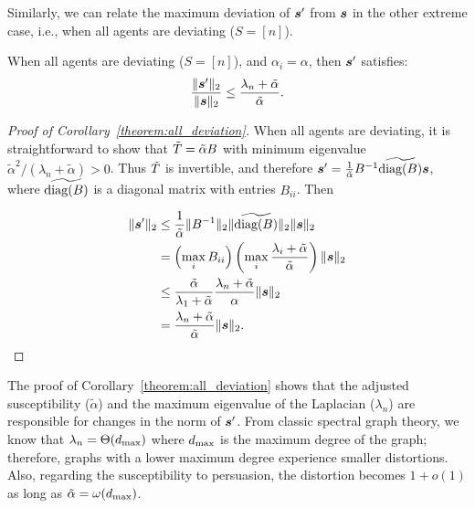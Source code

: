 Similarly, we can relate the maximum deviation of $\bm{s}^\prime$ from $\bm{s}$ in the other extreme case, i.e., when all agents are deviating ($S = [n]$). %
\begin{corollary}
    \label{theorem:all_deviation}
    When all agents are deviating ($S = [n]$), and $\alpha_i = \alpha$, then $\bm{s}^\prime$ satisfies: $$\frac {\| \bm{s}^\prime \|_2} {\| \bm{s} \|_2}  \le \frac {\lambda_n + \tilde \alpha} {\tilde \alpha}.$$
\end{corollary}

\begin{proof}[Proof of Corollary~\ref{theorem:all_deviation}]
    When all agents are deviating, it is straightforward to show that $\Tilde T = \tilde \alpha B$ with minimum eigenvalue $\tilde \alpha^2 / (\lambda_n + \tilde \alpha) > 0$. Thus $\Tilde T$ is invertible, and therefore $\bm{s}^\prime = \frac {1} {\tilde \alpha} B^{-1} \widetilde {\textrm{diag} (B)} \bm{s}$, where $\widetilde {\textrm{diag} (B)}$ is a diagonal matrix with entries $B_{ii}$. Then 

    \begin{align*}
        \| \bm{s}^\prime \|_2 & \le \frac {1} {\tilde \alpha} \| B^{-1} \|_2 \| \widetilde{\textrm{diag} (B)} \|_2 \| \bm{s} \|_2 \\ &  = \left ( \max_i B_{ii} \right ) \left ( \max_i \frac {\lambda_i + \tilde \alpha} {\tilde \alpha} \right ) \| \bm{s} \|_2 \\ & \le \frac {\tilde \alpha} {\lambda_1 + \tilde \alpha} \frac {\lambda_n + \tilde \alpha} {\alpha} \| \bm{s} \|_2 \\ & = \frac {\lambda_n + \tilde \alpha} {\tilde \alpha} \| \bm{s} \|_2.
    \end{align*}
    
\end{proof}

The proof of Corollary~\ref{theorem:all_deviation} shows that the adjusted susceptibility ($\tilde \alpha$) and the maximum eigenvalue of the Laplacian ($\lambda_n$) are responsible for changes in the norm of $\bm{s}^\prime$. From classic spectral graph theory, we know that $\lambda_n = \Theta(d_{\textup{max}})$ where $d_{\textup{max}}$ is the maximum degree of the graph; therefore, graphs with a lower maximum degree experience smaller distortions. Also, regarding the susceptibility to persuasion, the distortion becomes $1 + o(1)$ as long as $\tilde \alpha = \omega (d_{\textup{max}})$. 

\medskip

